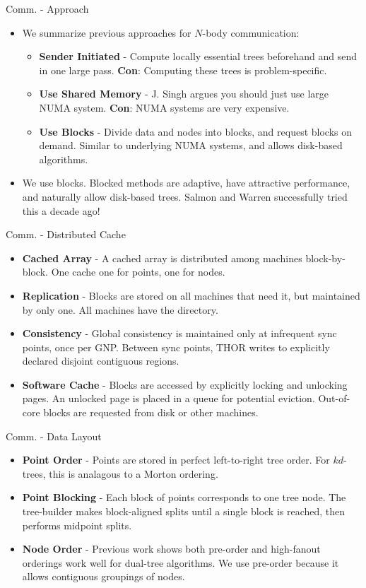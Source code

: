 \documentclass[pdf,colorBG,slideColor]{prosper}
\newcommand{\itemt}[1]{\item {\bf #1} -}
\begin{document}
\begin{slide}{Comm. - Approach}
  \begin{itemize}
    \item We summarize previous approaches for $N$-body communication:
    \begin{itemize}
      \itemt{Sender Initiated}
      Compute locally essential trees beforehand and send in one large pass.
      {\bf Con}: Computing these trees is problem-specific.
      \itemt{Use Shared Memory}
      J. Singh argues you should just use large NUMA system.
      {\bf Con}: NUMA systems are very expensive.
      \itemt{Use Blocks}
      Divide data and nodes into blocks, and request blocks on demand.
      Similar to underlying NUMA systems, and allows disk-based algorithms.
    \end{itemize}
    \item We use blocks.  Blocked methods are adaptive, have attractive
    performance, and naturally allow disk-based trees.
    Salmon and Warren successfully tried this a decade ago!
  \end{itemize}
\end{slide}

\begin{slide}{Comm. - Distributed Cache}
  \begin{itemize}
    \itemt{Cached Array}
    A cached array is distributed among machines block-by-block.
    One cache one for points, one for nodes.
    \itemt{Replication}
    Blocks are stored on all machines that need it, but maintained by only one.
    All machines have the directory.
    \itemt{Consistency}
    Global consistency is maintained only at infrequent sync points, once per GNP.
    Between sync points, THOR writes to explicitly declared disjoint contiguous regions.
    \itemt{Software Cache}
    Blocks are accessed by explicitly locking and unlocking pages.
    An unlocked page is placed in a queue for potential eviction.
    Out-of-core blocks are requested from disk or other machines.
  \end{itemize}
\end{slide}

\begin{slide}{Comm. - Data Layout}
  \begin{itemize}
    \itemt{Point Order}
    Points are stored in perfect left-to-right tree order.
    For $kd$-trees, this is analagous to a Morton ordering.
    \itemt{Point Blocking}
    Each block of points corresponds to one tree node.
    The tree-builder makes block-aligned splits until a single block
    is reached, then performs midpoint splits.
    \itemt{Node Order}
    Previous work shows both pre-order and high-fanout orderings work well
    for dual-tree algorithms. We use pre-order because it allows contiguous
    groupings of nodes.
  \end{itemize}
\end{slide}
\end{document}
